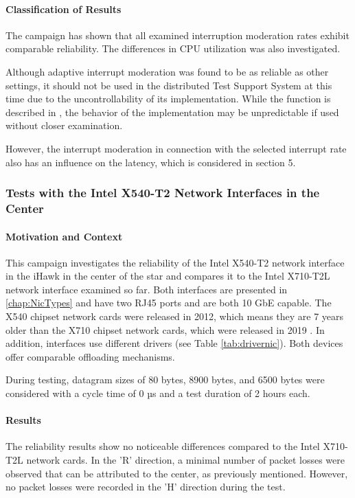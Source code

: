 \paragraph{Classification of Results}
The campaign has shown that all examined interruption moderation rates exhibit comparable reliability. The differences in CPU utilization was also investigated.

Although adaptive interrupt moderation was found to be as reliable as other settings, it should not be used in the distributed Test Support System at this time due to the uncontrollability of its implementation. While the function is described in \cite{intermod04}, the behavior of the implementation may be unpredictable if used without closer examination.

However, the interrupt moderation in connection with the selected interrupt rate also has an influence on the latency, which is considered in section 5. %

\subsubsection{Tests with the Intel X540-T2 Network Interfaces in the Center}
\paragraph{Motivation and Context}
This campaign investigates the reliability of the Intel X540-T2 network interface in the iHawk in the center of the star and compares it to the Intel X710-T2L network interface examined so far. Both interfaces are presented in \ref{chap:NicTypes} and have two RJ45 ports and are both 10 GbE capable. The X540 chipset network cards were released in 2012, which means they are 7 years older than the X710 chipset network cards, which were released in 2019 \cite{setupnw02, setupnw03}. In addition, interfaces use different drivers (see Table \ref{tab:drivernic}). Both devices offer comparable offloading mechanisms.

During testing, datagram sizes of 80 bytes, 8900 bytes, and 6500 bytes were considered with a cycle time of 0 µs and a test duration of 2 hours each.

\paragraph{Results}
The reliability results show no noticeable differences compared to the Intel X710-T2L network cards. In the 'R' direction, a minimal number of packet losses were observed that can be attributed to the center, as previously mentioned. However, no packet losses were recorded in the 'H' direction during the test.

